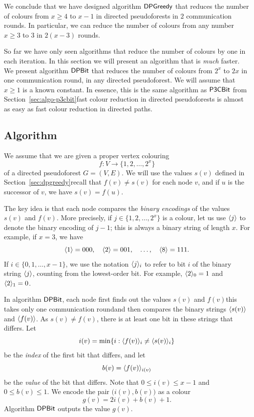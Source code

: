 We conclude that we have designed algorithm $\textsf{DPGreedy}$ that reduces the number of colours from $x \ge 4$ to $x-1$ in directed pseudoforests in $2$ communication rounds. In particular, we can reduce the number of colours from any number $x \ge 3$ to $3$ in ${2(x-3)}$ rounds.


\label{sec:dpbit}

So far we have only seen algorithms that reduce the number of colours by one in each iteration. In this section we will present an algorithm that is \emph{much} faster. We present algorithm $\textsf{DPBit}$ that reduces the number of colours from $2^x$ to $2x$ in one communication round, in any directed pseudoforest. We will assume that $x \ge 1$ is a known constant. In essence, this is the same algorithm as $\textsf{P3CBit}$ from Section~\ref{sec:algo-p3cbit}\mydash fast colour reduction in directed pseudoforests is almost as easy as fast colour reduction in directed paths.

\subsection{Algorithm}

We assume that we are given a proper vertex colouring
\[
    f \colon V \to \{ 1,2,\dotsc,2^x\}
\]    
of a directed pseudoforest $G = (V,E)$. We will use the values $s(v)$ defined in Section~\ref{sec:dpgreedy}\mydash recall that $f(v) \ne s(v)$ for each node $v$, and if $u$ is the successor of $v$, we have $s(v) = f(u)$.

The key idea is that each node compares the \emph{binary encodings} of the values $s(v)$ and $f(v)$. More precisely, if $j \in \{1,2,\dotsc,2^x\}$ is a colour, let us use $\langle j \rangle$ to denote the binary encoding of $j-1$; this is always a binary string of length $x$. For example, if $x = 3$, we have
\[
    \langle 1 \rangle = 000,\quad
    \langle 2 \rangle = 001,\quad
    \dotsc, \quad
    \langle 8 \rangle = 111.
\]
If $i \in \{0,1,\dotsc,x-1\}$, we use the notation $\langle j \rangle_i$ to refer to bit $i$ of the binary string $\langle j \rangle$, counting from the lowest-order bit. For example, $\langle 2 \rangle_0 = 1$ and $\langle 2 \rangle_1 = 0$.

In algorithm $\textsf{DPBit}$, each node first finds out the values $s(v)$ and $f(v)$\mydash this takes only one communication round\mydash and then compares the binary strings $\langle s(v) \rangle$ and $\langle f(v) \rangle$. As $s(v) \ne f(v)$, there is at least one bit in these strings that differs. Let
\[
    i(v) = \min \{ i : \langle f(v) \rangle_i \ne \langle s(v) \rangle_i \}
\]
be the \emph{index} of the first bit that differs, and let
\[
    b(v) = \langle f(v) \rangle_{i(v)}
\]
be the \emph{value} of the bit that differs. Note that $0 \le i(v) \le x-1$ and $0 \le b(v) \le 1$. We encode the pair $\bigl(i(v), b(v)\bigr)$ as a colour
\[
    g(v) = 2i(v) + b(v) + 1.
\]
Algorithm $\textsf{DPBit}$ outputs the value $g(v)$.


